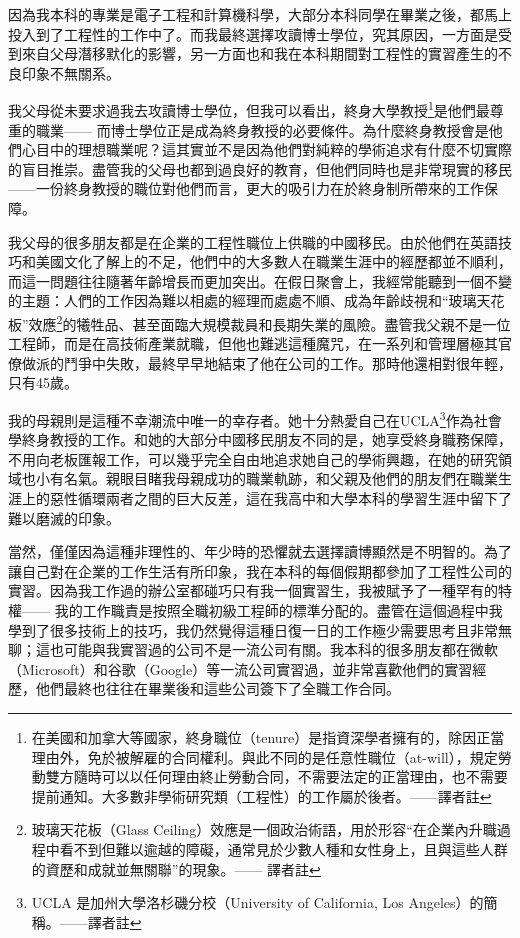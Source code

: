 \documentclass[12pt,UTF8,nofonts]{book}
\begin{document}
\mainmatter



因為我本科的專業是電子工程和計算機科學，大部分本科同學在畢業之後，都馬上投入到了工程性的工作中了。而我最終選擇攻讀博士學位，究其原因，一方面是受到來自父母潛移默化的影響，另一方面也和我在本科期間對工程性的實習產生的不良印象不無關系。

我父母從未要求過我去攻讀博士學位，但我可以看出，終身大學教授\footnote{在美國和加拿大等國家，終身職位（tenure）是指資深學者擁有的，除因正當理由外，免於被解雇的合同權利。與此不同的是任意性職位（at-will），規定勞動雙方隨時可以以任何理由終止勞動合同，不需要法定的正當理由，也不需要提前通知。大多數非學術研究類（工程性）的工作屬於後者。——譯者註}是他們最尊重的職業—— 而博士學位正是成為終身教授的必要條件。為什麼終身教授會是他們心目中的理想職業呢？這其實並不是因為他們對純粹的學術追求有什麼不切實際的盲目推崇。盡管我的父母也都到過良好的教育，但他們同時也是非常現實的移民——一份終身教授的職位對他們而言，更大的吸引力在於終身制所帶來的工作保障。

我父母的很多朋友都是在企業的工程性職位上供職的中國移民。由於他們在英語技巧和美國文化了解上的不足，他們中的大多數人在職業生涯中的經歷都並不順利，而這一問題往往隨著年齡增長而更加突出。在假日聚會上，我經常能聽到一個不變的主題：人們的工作因為難以相處的經理而處處不順、成為年齡歧視和“玻璃天花板”效應\footnote{玻璃天花板（Glass Ceiling）效應是一個政治術語，用於形容“在企業內升職過程中看不到但難以逾越的障礙，通常見於少數人種和女性身上，且與這些人群的資歷和成就並無關聯”的現象。—— 譯者註}的犧牲品、甚至面臨大規模裁員和長期失業的風險。盡管我父親不是一位工程師，而是在高技術產業就職，但他也難逃這種魔咒，在一系列和管理層極其官僚做派的鬥爭中失敗，最終早早地結束了他在公司的工作。那時他還相對很年輕，只有45歲。

我的母親則是這種不幸潮流中唯一的幸存者。她十分熱愛自己在UCLA\footnote{UCLA 是加州大學洛杉磯分校（University of California, Los Angeles）的簡稱。——譯者註}作為社會學終身教授的工作。和她的大部分中國移民朋友不同的是，她享受終身職務保障，不用向老板匯報工作，可以幾乎完全自由地追求她自己的學術興趣，在她的研究領域也小有名氣。親眼目睹我母親成功的職業軌跡，和父親及他們的朋友們在職業生涯上的惡性循環兩者之間的巨大反差，這在我高中和大學本科的學習生涯中留下了難以磨滅的印象。

當然，僅僅因為這種非理性的、年少時的恐懼就去選擇讀博顯然是不明智的。為了讓自己對在企業的工作生活有所印象，我在本科的每個假期都參加了工程性公司的實習。因為我工作過的辦公室都碰巧只有我一個實習生，我被賦予了一種罕有的特權—— 我的工作職責是按照全職初級工程師的標準分配的。盡管在這個過程中我學到了很多技術上的技巧，我仍然覺得這種日復一日的工作極少需要思考且非常無聊；這也可能與我實習過的公司不是一流公司有關。我本科的很多朋友都在微軟（Microsoft）和谷歌（Google）等一流公司實習過，並非常喜歡他們的實習經歷，他們最終也往往在畢業後和這些公司簽下了全職工作合同。
\end{document}
